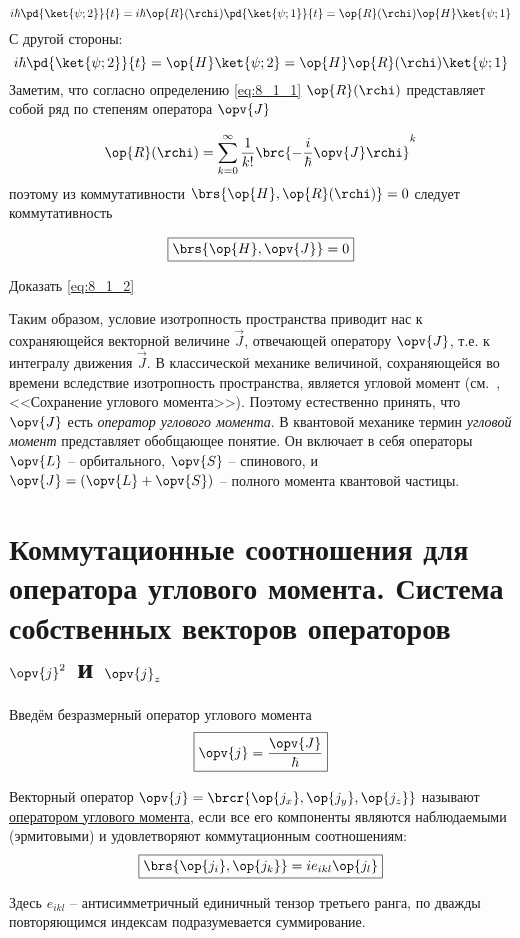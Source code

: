 $$
i\hbar \pd{\ket{\psi;2}}{t} = i\hbar \op{R}(\rchi) \pd{\ket{\psi;1}}{t} = \op{R}(\rchi) \op{H}\ket{\psi;1}
$$%
%
С другой стороны:
$$
i\hbar \pd{\ket{\psi;2}}{t} = \op{H}\ket{\psi;2} = \op{H} \op{R}(\rchi) \ket{\psi;1}
$$%
%
Заметим, что согласно определению \eqref{eq:8_1_1} $\op{R}(\rchi)$ представляет собой ряд по степеням оператора $\opv{J}$

$$
\op{R}(\rchi) = \sum_{k=0}^{\infty} \frac{1}{k!} \brc{- \frac{i}{\hbar} \opv{J} \rchi}^k
$$%
%
поэтому из коммутативности $\brs{\op{H}, \op{R}(\rchi)} = 0$ следует коммутативность

\begin{equation}
\label{eq:8_1_2}
\boxed {
	\brs{\op{H}, \opv{J}} = 0
}
\end{equation}

\begin{excr}
Доказать \eqref{eq:8_1_2}
\end{excr}

Таким образом, условие изотропность пространства приводит нас к сохраняющейся векторной величине $\vec{J}$, отвечающей оператору $\opv{J}$, т.е. к интегралу движения $\vec{J}$. В классической механике величиной, сохраняющейся во времени вследствие изотропность пространства, является угловой момент (см.~, <<Сохранение углового момента>>). Поэтому естественно принять, что $\opv{J}$ есть {\em оператор углового момента}. В квантовой механике термин {\em угловой момент } представляет обобщающее понятие. Он включает в себя операторы $\opv{L}$ -- орбитального, $\opv{S}$ -- спинового, и $\opv{J} = (\opv{L} + \opv{S})$ -- полного момента квантовой частицы.

\begin{sloppypar}
  \section{Коммутационные соотношения для оператора углового момента. Система собственных векторов операторов \texorpdfstring{$\opv{j}^2$ и $\opv{j}_z$}{углового момента}}
\end{sloppypar}

Введём безразмерный оператор углового момента
$$
\boxed{
  \opv{j} = \frac{\opv{J}}{\hbar}
}
$$

\begin{defn}
Векторный оператор $\opv{j} = \brcr{\op{j_x}, \op{j_y}, \op{j_z}}$ называют \underline{оператором углового момента}, если все его компоненты являются наблюдаемыми (эрмитовыми) и удовлетворяют коммутационным соотношениям:
\begin{equation}
\label{eq:8_2_1}
\boxed {
	\brs{\op{j_i}, \op{j_k}} = i e_{ikl} \op{j_l}
}
\end{equation}
\end{defn}
%
Здесь $e_{ikl}$ -- антисимметричный единичный тензор третьего ранга, по дважды повторяющимся индексам подразумевается суммирование.

